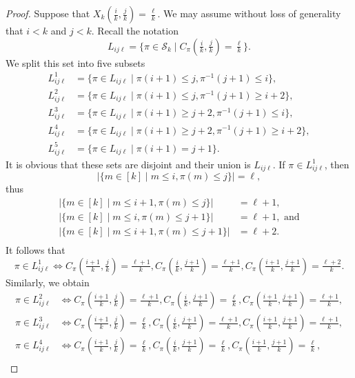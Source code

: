 \documentclass[12pt,a4paper]{amsart}
\theoremstyle{definition}
\newcommand{\SK}{\mathcal{S}_k}
\begin{document}
\begin{proof}
Suppose that $X_k(\tfrac{i}{k},\tfrac{j}{k}) = \tfrac{\ell}{k}$. We may assume without loss of generality that $i<k$ and $j<k$. Recall the notation 
$$L_{ij\ell} = \{\pi \in \SK \mid C_\pi(\tfrac{i}{k},\tfrac{j}{k}) = \tfrac{\ell}{k}\}. $$
We split this set into five subsets
\begin{align*}
   L_{ij\ell}^1 &= \{\pi \in L_{ij\ell} \mid \pi(i+1)\le j, \pi^{-1}(j+1)\le i\}, \\
   L_{ij\ell}^2 &= \{\pi \in L_{ij\ell} \mid \pi(i+1)\le j, \pi^{-1}(j+1)\ge i+2\}, \\
   L_{ij\ell}^3 &= \{\pi \in L_{ij\ell} \mid \pi(i+1)\ge j+2, \pi^{-1}(j+1)\le i\}, \\
   L_{ij\ell}^4 &= \{\pi \in L_{ij\ell} \mid \pi(i+1)\ge j+2, \pi^{-1}(j+1)\ge i+2\}, \\
   L_{ij\ell}^5 &= \{\pi \in L_{ij\ell} \mid \pi(i+1) = j+1\}. 
\end{align*}
It is obvious that these sets are disjoint and their union is $L_{ij\ell}$. If $\pi \in L_{ij\ell}^1$, then 
$$|\{m \in [k] \mid m\le i, \pi(m) \le j\}| = \ell,$$
thus
\begin{align*}
    |\{m \in [k] \mid m\le i+1, \pi(m) \le j\}| &= \ell+1, \\
    |\{m \in [k] \mid m\le i, \pi(m) \le j+1\}| &= \ell+1,  \text{ and}\\
    |\{m \in [k] \mid m\le i+1, \pi(m) \le j+1\}| &= \ell+2. \\
\end{align*} 
It follows that
\begin{equation} \label{eq:Lijl1}
    \pi \in L_{ij\ell}^1 \Leftrightarrow C_\pi(\tfrac{i+1}{k},\tfrac{j}{k}) = \tfrac{\ell+1}{k},  C_\pi(\tfrac{i}{k},\tfrac{j+1}{k}) = \tfrac{\ell+1}{k},  C_\pi(\tfrac{i+1}{k},\tfrac{j+1}{k}) = \tfrac{\ell+2}{k}.
\end{equation} 
Similarly, we obtain
\begin{align*}
   \pi \in L_{ij\ell}^2 &\Leftrightarrow C_\pi(\tfrac{i+1}{k},\tfrac{j}{k}) = \tfrac{\ell+1}{k},  C_\pi(\tfrac{i}{k},\tfrac{j+1}{k}) = \tfrac{\ell}{k},  C_\pi(\tfrac{i+1}{k},\tfrac{j+1}{k}) = \tfrac{\ell+1}{k}, \\
   \pi \in L_{ij\ell}^3 &\Leftrightarrow C_\pi(\tfrac{i+1}{k},\tfrac{j}{k}) = \tfrac{\ell}{k},  C_\pi(\tfrac{i}{k},\tfrac{j+1}{k}) = \tfrac{\ell+1}{k},  C_\pi(\tfrac{i+1}{k},\tfrac{j+1}{k}) = \tfrac{\ell+1}{k}, \\
   \pi \in L_{ij\ell}^4 &\Leftrightarrow C_\pi(\tfrac{i+1}{k},\tfrac{j}{k}) = \tfrac{\ell}{k},  C_\pi(\tfrac{i}{k},\tfrac{j+1}{k}) = \tfrac{\ell}{k},  C_\pi(\tfrac{i+1}{k},\tfrac{j+1}{k}) = \tfrac{\ell}{k}, \\

\end{align*}
\end{proof}
\end{document}
